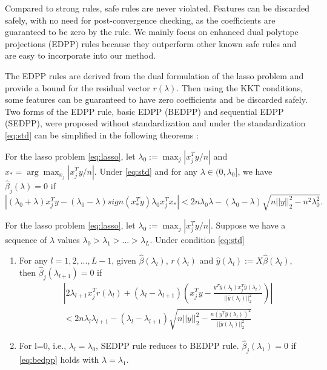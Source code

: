 Compared to strong rules, safe rules are never violated. Features can be discarded safely, with no need for post-convergence checking, as the coefficients are guaranteed to be zero by the rule. We mainly focus on enhanced dual polytope projections (EDPP) rules\citep{wang2013lasso} because they outperform other known safe rules and are easy to incorporate into our method.

The EDPP rules are derived from the dual formulation of the lasso problem and provide a bound for the residual vector $r(\lambda)$. Then using the KKT conditions, some features can be guaranteed to have zero coefficients and be discarded safely. Two forms of the EDPP rule, basic EDPP (BEDPP) and sequential EDPP (SEDPP)\citep{wang2013lasso}, were proposed without standardization and under the standardization \eqref{eq:std} can be simplified in the following theorems \citep{Zeng2021}:

\begin{theorem}[BEDPP]
    For the lasso problem \eqref{eq:lasso}, let $\lambda_0:=\max_j|x_j^Ty/n|$ and $x_*=\arg \max_{x_j}|x_j^Ty/n|$. Under \eqref{eq:std} and for any $\lambda\in(0,\lambda_0]$, we have $\hat{\beta}_j(\lambda)=0$ if
    \begin{equation}
        \label{eq:bedpp}
        |(\lambda_0+\lambda)x_j^Ty-(\lambda_0-\lambda)sign(x_*^Ty)\lambda_0x_j^Tx_*|<2n\lambda_0\lambda-(\lambda_0-\lambda)\sqrt{n||y||_2^2-n^2\lambda_0^2}.
    \end{equation}
\end{theorem}

\begin{theorem}[SEDPP]
    For the lasso problem \eqref{eq:lasso}, let $\lambda_0:=\max_j|x_j^Ty/n|$. Suppose we have a sequence of $\lambda$ values $\lambda_0>\lambda_1>...>\lambda_L$. Under condition \eqref{eq:std}
    \begin{enumerate}
        \item For any $l=1,2,...,L-1$, given $\hat{\beta}(\lambda_l)$, $r(\lambda_l)$ and $\hat{y}(\lambda_l):=X\hat{\beta}(\lambda_l)$, then $\hat{\beta}_j(\lambda_{l+1})=0$ if
        \begin{equation}
            \label{eq:sedpp}
            \begin{split}
                &\left|2\lambda_{l+1}x_j^Tr(\lambda_l)+(\lambda_l-\lambda_{l+1})\left( x_j^Ty-\frac{y^T\hat{y}(\lambda_l)x_j^T\hat{y}(\lambda_l)}{||\hat{y}(\lambda_l)||_2^2}\right)\right|\\&<2n\lambda_l\lambda_{l+1}-(\lambda_l-\lambda_{l+1})\sqrt{n||y||_2^2-\frac{n(y^T\hat{y}(\lambda_l))^2}{||\hat{y}(\lambda_l)||_2^2}}
            \end{split}
        \end{equation}
        \item For l=0, i.e., $\lambda_l=\lambda_0$, SEDPP rule reduces to BEDPP rule. $\hat{\beta}_j(\lambda_1)=0$ if \eqref{eq:bedpp} holds with $\lambda=\lambda_1$.
    \end{enumerate}
\end{theorem}

